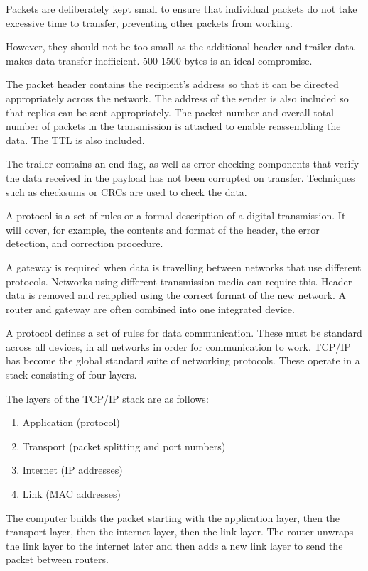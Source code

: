 \documentclass[../main.tex]{subfile}
\begin{document}
Packets are deliberately kept small to ensure that individual packets do not take excessive time to transfer, preventing other packets from working.

However, they should not be too small as the additional header and trailer data makes data transfer inefficient. 500-1500 bytes is an ideal compromise.

The packet header contains the recipient's address so that it can be directed appropriately across the network. The address of the sender is also included so that replies can be sent appropriately. The packet number and overall total number of packets in the transmission is attached to enable reassembling the data. The TTL is also included.

The trailer contains an end flag, as well as error checking components that verify the data received in the payload has not been corrupted on transfer. Techniques such as checksums or CRCs are used to check the data.


A protocol is a set of rules or a formal description of a digital transmission. It will cover, for example, the contents and format of the header, the error detection, and correction procedure.

A gateway is required when data is travelling between networks that use different protocols. Networks using different transmission media can require this. Header data is removed and reapplied using the correct format of the new network. A router and gateway are often combined into one integrated device.

A protocol defines a set of rules for data communication. These must be standard across all devices, in all networks in order for communication to work. TCP/IP has become the global standard suite of networking protocols. These operate in a stack consisting of four layers.

The layers of the TCP/IP stack are as follows:\vspace{-1.5ex}\begin{enumerate}
	\item Application (protocol)
	\item Transport (packet splitting and port numbers)
	\item Internet (IP addresses)
	\item Link (MAC addresses)
\end{enumerate}

The computer builds the packet starting with the application layer, then the transport layer, then the internet layer, then the link layer. The router unwraps the link layer to the internet later and then adds a new link layer to send the packet between routers.
\end{document}
